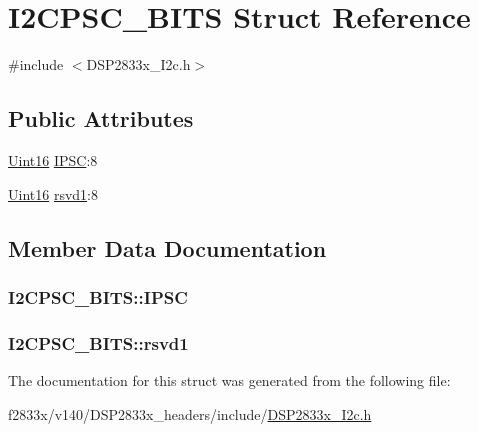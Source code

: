 \hypertarget{struct_i2_c_p_s_c___b_i_t_s}{}\section{I2\+C\+P\+S\+C\+\_\+\+B\+I\+T\+S Struct Reference}
\label{struct_i2_c_p_s_c___b_i_t_s}


{\ttfamily \#include $<$D\+S\+P2833x\+\_\+\+I2c.\+h$>$}

\subsection*{Public Attributes}
\begin{DoxyCompactItemize}
\item 
\hyperlink{_d_s_p2833x___device_8h_a59a9f6be4562c327cbfb4f7e8e18f08b}{Uint16} \hyperlink{struct_i2_c_p_s_c___b_i_t_s_a1061a011ec6906c0ce70921f01ddbc12}{I\+P\+S\+C}\+:8
\item 
\hyperlink{_d_s_p2833x___device_8h_a59a9f6be4562c327cbfb4f7e8e18f08b}{Uint16} \hyperlink{struct_i2_c_p_s_c___b_i_t_s_a0d75d7cfd0c7f4043490b48d4c91eb89}{rsvd1}\+:8
\end{DoxyCompactItemize}


\subsection{Member Data Documentation}
\hypertarget{struct_i2_c_p_s_c___b_i_t_s_a1061a011ec6906c0ce70921f01ddbc12}{}
\subsubsection[{I\+P\+S\+C}]{ I2\+C\+P\+S\+C\+\_\+\+B\+I\+T\+S\+::\+I\+P\+S\+C}\label{struct_i2_c_p_s_c___b_i_t_s_a1061a011ec6906c0ce70921f01ddbc12}
\hypertarget{struct_i2_c_p_s_c___b_i_t_s_a0d75d7cfd0c7f4043490b48d4c91eb89}{}
\subsubsection[{rsvd1}]{ I2\+C\+P\+S\+C\+\_\+\+B\+I\+T\+S\+::rsvd1}\label{struct_i2_c_p_s_c___b_i_t_s_a0d75d7cfd0c7f4043490b48d4c91eb89}


The documentation for this struct was generated from the following file\+:\begin{DoxyCompactItemize}
\item 
f2833x/v140/\+D\+S\+P2833x\+\_\+headers/include/\hyperlink{_d_s_p2833x___i2c_8h}{D\+S\+P2833x\+\_\+\+I2c.\+h}\end{DoxyCompactItemize}
